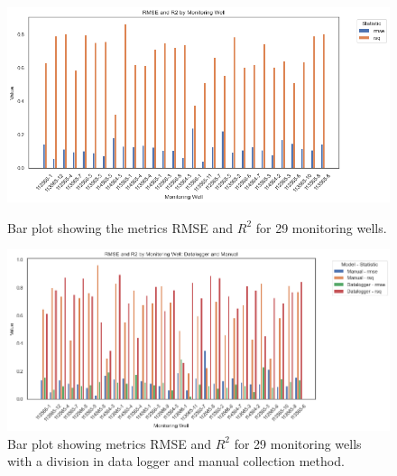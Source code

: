 \begin{figure}[h]
    \centering
    \begin{minipage}{0.48\textwidth}
        \centering
        \includegraphics[width=\linewidth]{frontmatter/Rozenburg-fig/rmser2roz.png} %
        \caption{Bar plot showing the metrics RMSE and $R^2$ for 29 monitoring wells.}
        \label{bar1}
    \end{minipage}\hfill
    \begin{minipage}{0.48\textwidth}
        \centering
        \includegraphics[width=\linewidth]{frontmatter/Rozenburg-fig/rmser2roz2.png} %
        \caption{Bar plot showing metrics RMSE and $R^2$ for 29 monitoring wells with a division in data logger and manual collection method.}
        \label{bar2}
    \end{minipage}
\end{figure}

